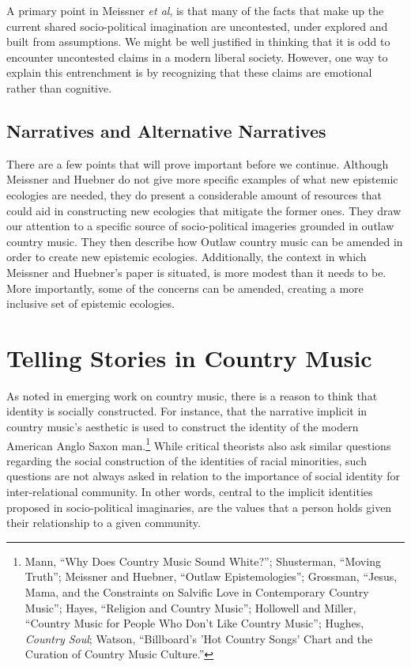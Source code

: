 \documentclass[phdthesis,12pt,final,a4paper]{wuthesis}
\theoremstyle{definition}
\theoremstyle{definition}
\theoremstyle{definition}
\theoremstyle{definition}
\theoremstyle{remark}
\begin{document}
A primary point in Meissner \emph{et al}, is that many of the facts that make up the current shared socio-political imagination are uncontested, under explored and built from assumptions. We might be well justified in thinking that it is odd to encounter uncontested claims in a modern liberal society. However, one way to explain this entrenchment is by recognizing that these claims are emotional rather than cognitive.

\subsection*{Narratives and Alternative Narratives}\label{narratives-and-alternative-narratives}

There are a few points that will prove important before we continue. Although Meissner and Huebner do not give more specific examples of what new epistemic ecologies are needed, they do present a considerable amount of resources that could aid in constructing new ecologies that mitigate the former ones. They draw our attention to a specific source of socio-political imageries grounded in outlaw country music. They then describe how Outlaw country music can be amended in order to create new epistemic ecologies. Additionally, the context in which Meissner and Huebner's paper is situated, is more modest than it needs to be. More importantly, some of the concerns can be amended, creating a more inclusive set of epistemic ecologies.

\section{Telling Stories in Country Music}\label{telling-stories-in-country-music}

As noted in emerging work on country music, there is a reason to think that identity is socially constructed. For instance, that the narrative implicit in country music's aesthetic is used to construct the identity of the modern American Anglo Saxon man.\footnote{Mann, {``Why Does Country Music Sound White?''}; Shusterman, {``Moving {Truth}''}; Meissner and Huebner, {``Outlaw Epistemologies''}; Grossman, {``Jesus, {Mama}, and the {Constraints} on {Salvific Love} in {Contemporary Country Music}''}; Hayes, {``Religion and {Country Music}''}; Hollowell and Miller, {``Country {Music} for {People Who Don}'t {Like Country Music}''}; Hughes, \emph{Country Soul}; Watson, {``Billboard's '{Hot Country Songs}' Chart and the Curation of Country Music Culture.''}} While critical theorists also ask similar questions regarding the social construction of the identities of racial minorities, such questions are not always asked in relation to the importance of social identity for inter-relational community. In other words, central to the implicit identities proposed in socio-political imaginaries, are the values that a person holds given their relationship to a given community.
\end{document}
